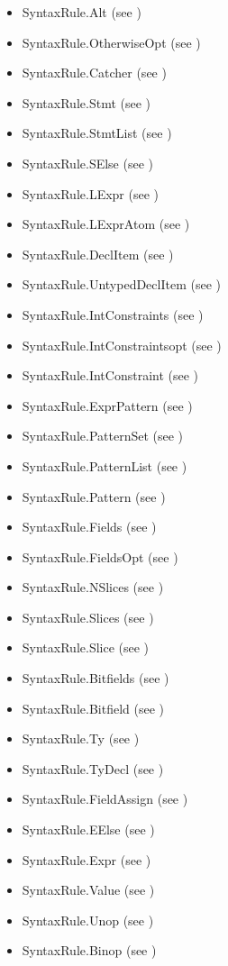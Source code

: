 \documentclass{book}
\begin{document}
\begin{itemize}
  \item SyntaxRule.Alt (see )
  \item SyntaxRule.OtherwiseOpt (see )
  \item SyntaxRule.Catcher (see )
  \item SyntaxRule.Stmt (see )
  \item SyntaxRule.StmtList (see )
  \item SyntaxRule.SElse (see )
  \item SyntaxRule.LExpr (see )
  \item SyntaxRule.LExprAtom (see )
  \item SyntaxRule.DeclItem (see )
  \item SyntaxRule.UntypedDeclItem (see )
  \item SyntaxRule.IntConstraints (see )
  \item SyntaxRule.IntConstraintsopt (see )
  \item SyntaxRule.IntConstraint (see )
  \item SyntaxRule.ExprPattern (see )
  \item SyntaxRule.PatternSet (see )
  \item SyntaxRule.PatternList (see )
  \item SyntaxRule.Pattern (see )
  \item SyntaxRule.Fields (see )
  \item SyntaxRule.FieldsOpt (see )
  \item SyntaxRule.NSlices (see )
  \item SyntaxRule.Slices (see )
  \item SyntaxRule.Slice (see )
  \item SyntaxRule.Bitfields (see )
  \item SyntaxRule.Bitfield (see )
  \item SyntaxRule.Ty (see )
  \item SyntaxRule.TyDecl (see )
  \item SyntaxRule.FieldAssign (see )
  \item SyntaxRule.EElse (see )
  \item SyntaxRule.Expr (see )
  \item SyntaxRule.Value (see )
  \item SyntaxRule.Unop (see )
  \item SyntaxRule.Binop (see )
\end{itemize}
\end{document}
